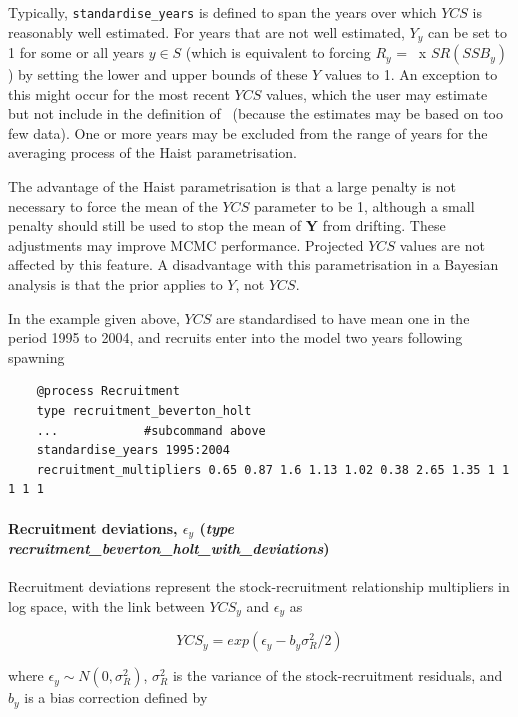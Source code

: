 Typically, \texttt{standardise\_years} is defined to span the years over which $YCS$ is reasonably well estimated. For years that are not well estimated, $Y_y$ can be set to 1 for some or all years $y\in S$ (which is equivalent to forcing $R_y$ = \Rzero\ x $SR(SSB_y)$) by setting the lower and upper bounds of these $Y$ values to 1. An exception to this might occur for the most recent $YCS$ values, which the user may estimate but not include in the definition of \Rzero\ (because the estimates may be based on too few data). One or more years may be excluded from the range of years for the averaging process of the Haist parametrisation.

The advantage of the Haist parametrisation is that a large penalty is not necessary to force the mean of the $YCS$ parameter to be 1, although a small penalty should still be used to stop the mean of \textbf{Y} from drifting. These adjustments may improve MCMC performance. Projected $YCS$ values are not affected by this feature. A disadvantage with this parametrisation in a Bayesian analysis is that the prior applies to $Y$, not $YCS$.

In the  example given above, $YCS$ are standardised to have mean one in the period 1995 to 2004, and recruits enter into the model two years following spawning

{\small{\begin{verbatim}
	@process Recruitment
	type recruitment_beverton_holt
	...            #subcommand above
	standardise_years 1995:2004
	recruitment_multipliers 0.65 0.87 1.6 1.13 1.02 0.38 2.65 1.35 1 1 1 1 1
\end{verbatim}}}

\paragraph*{Recruitment deviations, $\epsilon_y$ (\emph{type recruitment\_beverton\_holt\_with\_deviations})} \label{sec:Process-RecruitmentBevertonHoltWithDeviations} 

Recruitment deviations represent the stock-recruitment relationship multipliers in log space, with the link between $YCS_y$ and $\epsilon_y$ as

\begin{equation}\label{eq:recruit_devs}
	YCS_y = exp(\epsilon_y - b_y\sigma^2_R / 2)
\end{equation}

where $\epsilon_y\sim N(0,\sigma^2_R)$, $\sigma^2_R$ is the variance of the stock-recruitment residuals, and $b_y$ is a bias correction defined by \cite{methot2011adjusting}

